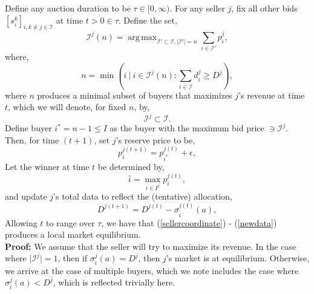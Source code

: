 \documentclass[12pt]{article}
\theoremstyle{definition}
\newcommand{\mcI}{\mathcal{I}}
\newcommand{\g}{\sigma}
\DeclareMathOperator*{\argmax}{arg\,max}
\begin{document}
\begin{multicols}{2}
{
\label{sellerstrategy}
Define any auction duration to be $\tau \in [0,\infty)$. 
For any seller $j$, fix all other bids $[s_i^k]_{i,k\ne j \in\mcI}$ at time $t>0\in\tau$.
Define the set,
$$
    \mcI^j(n) =\argmax_{{\mcI}' \subset \mcI, \vert{\mcI}'\vert =
n}\sum_{i\in{\mcI}'} p_i^j,
$$
where,
\begin{equation}\label{sellercoordinate}
    n = \min( i \ \vert \ i \in\mcI^j(n) : \displaystyle\sum_{i\in\mcI} d_i^j \ge
D^j),
\end{equation} 
where $n$ produces a minimal subset 
of buyers that maximizes $j$'s revenue at time $t$, which we will
denote, for fixed $n$, by,
\begin{equation}\label{buyers}
    \mcI^j \subset \mcI.
\end{equation} 
Define buyer $i^* = n-1 \le I$ as the buyer with the maximum bid price $\ni
\mcI^j$.
Then, for time $(t+1)$, set $j$'s reserve price to be, 
\begin{equation}\label{newprice}
    p_i^{j(t+1)} = p_{i^*}^{j(t)} + \epsilon,
\end{equation}
Let the winner at time $t$ be determined by,
\begin{equation}\label{winner}
    \bar{i} = \displaystyle\max_{i\in I^j} p_i^{j(t)},
\end{equation}
and update $j$'s total data to reflect the (tentative) allocation,
\begin{equation}\label{newdata}
    D^{j(t+1)} = D^{j(t)} - \g_{\bar{i}}^{j(t)}(a),
\end{equation}
Allowing $t$ to range over $\tau$, we have that (\ref{sellercoordinate}) -
(\ref{newdata}) produces a local market equilibrium. 
}\\
\textbf{Proof:}
We assume that the seller will try to maximize its revenue. In the case where
$\vert\mcI^j\vert =1$, then if $\g_i^j(a)=D^j$, then $j$'s market is at equilibrium.
Otherwise, we arrive at the case of multiple buyers, which we note includes the
case where $\g_i^j(a) < D^j$, which is reflected trivially here.


\end{multicols}
\end{document}
